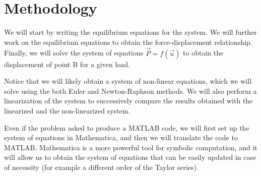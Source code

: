 \section{Methodology}

We will start by writing the equilibrium equations for the system.
We will further work on the equilibrium equations to obtain the force-displacement relationship.
Finally, we will solve the system of equations ${\vec{P}} = f({\vec{u}})$ to obtain the displacement of point B for a given load.

Notice that we will likely obtain a system of non-linear equations, which we will solve using the both Euler and Newton-Raphson methods.
We will also perform a linearization of the system to successively compare the results obtained with the linearized and the non-linearized system.

Even if the problem asked to produce a MATLAB code, we will first set up the system of equations in Mathematica, and then we will translate the code to MATLAB.
Mathematica is a more powerful tool for symbolic computation, and it will allow us to obtain the system of equations that can be easily updated in case of necessity (for example a different order of the Taylor series).
